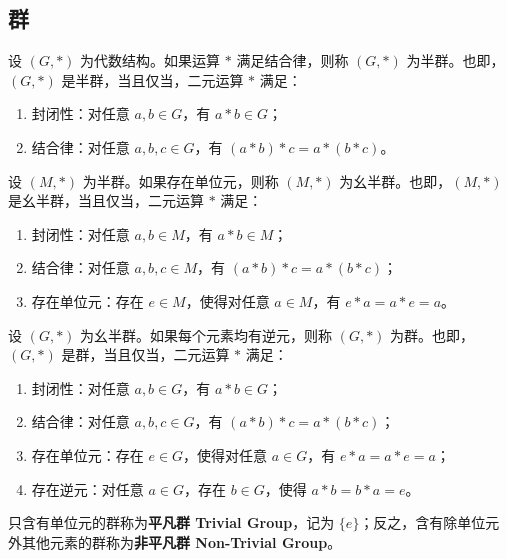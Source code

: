 \subsection{群}

\begin{definition}[半群 Semigroup]
    设 $ (G,\ast) $ 为代数结构。如果运算 $ \ast $ 满足结合律，则称 $ (G,\ast) $ 为半群。也即，$ (G,\ast) $ 是半群，当且仅当，二元运算 $ \ast $ 满足：
    \begin{enumerate}
        \item 封闭性：对任意 $ a,b\in G $，有 $ a\ast b\in G $；
        \item 结合律：对任意 $ a,b,c\in G $，有 $ (a\ast b)\ast c = a\ast (b\ast c) $。
    \end{enumerate}
\end{definition}

\begin{definition}
    设 $ (M,\ast) $ 为半群。如果存在单位元，则称 $ (M,\ast) $ 为幺半群。也即，$ (M,\ast) $ 是幺半群，当且仅当，二元运算 $ \ast $ 满足：
    \begin{enumerate}
        \item 封闭性：对任意 $ a,b\in M $，有 $ a\ast b\in M $；
        \item 结合律：对任意 $ a,b,c\in M $，有 $ (a\ast b)\ast c = a\ast (b\ast c) $；
        \item 存在单位元：存在 $ e\in M $，使得对任意 $ a\in M $，有 $ e\ast a = a\ast e = a $。
    \end{enumerate}
\end{definition}

\begin{definition}[群 Group]
    设 $ (G,\ast) $ 为幺半群。如果每个元素均有逆元，则称 $ (G,\ast) $ 为群。也即，$ (G,\ast) $ 是群，当且仅当，二元运算 $ \ast $ 满足：
    \begin{enumerate}
        \item 封闭性：对任意 $ a,b\in G $，有 $ a\ast b\in G $；
        \item 结合律：对任意 $ a,b,c\in G $，有 $ (a\ast b)\ast c = a\ast (b\ast c) $；
        \item 存在单位元：存在 $ e\in G $，使得对任意 $ a\in G $，有 $ e\ast a = a\ast e = a $；
        \item 存在逆元：对任意 $ a\in G $，存在 $ b\in G $，使得 $ a\ast b = b\ast a = e $。
    \end{enumerate}
    只含有单位元的群称为\textbf{平凡群 Trivial Group}，记为 $ \{e\} $；反之，含有除单位元外其他元素的群称为\textbf{非平凡群 Non-Trivial Group}。
\end{definition}

